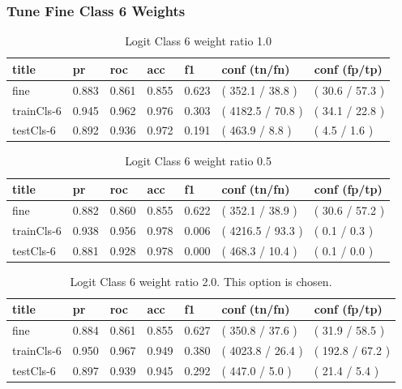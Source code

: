 \documentclass[ms]{nuthesis}
\begin{document}
\subsubsection{Tune Fine Class 6 Weights}

\FloatBarrier
\begin{table}[H]
\centering
\caption{Logit Class 6 weight ratio 1.0}
\label{tab:LogRegCls6-Wt1}
\begin{tabular}{|l||l||l||l||l||l||l|}\toprule
title & pr & roc & acc & f1 & conf (tn/fn) & conf (fp/tp) \\ \midrule
fine & 0.883 & 0.861 & 0.855 & 0.623 & ( 352.1 / 38.8 ) & ( 30.6 / 57.3 ) \\
trainCls-6 & 0.945 & 0.962 & 0.976 & 0.303 & ( 4182.5 / 70.8 ) & ( 34.1 / 22.8 ) \\
testCls-6 & 0.892 & 0.936 & 0.972 & 0.191 & ( 463.9 / 8.8 ) & ( 4.5 / 1.6 ) \\ \bottomrule
\end{tabular}
\end{table}
\FloatBarrier

\FloatBarrier
\begin{table}[H]
\centering
\caption{Logit Class 6 weight ratio 0.5}
\label{tab:LogRegCls6-Wtp5}
\begin{tabular}{|l||l||l||l||l||l||l|}\toprule
title & pr & roc & acc & f1 & conf (tn/fn) & conf (fp/tp) \\ \midrule
fine & 0.882 & 0.860 & 0.855 & 0.622 & ( 352.1 / 38.9 ) & ( 30.6 / 57.2 ) \\
trainCls-6 & 0.938 & 0.956 & 0.978 & 0.006 & ( 4216.5 / 93.3 ) & ( 0.1 / 0.3 ) \\
testCls-6 & 0.881 & 0.928 & 0.978 & 0.000 & ( 468.3 / 10.4 ) & ( 0.1 / 0.0 ) \\ \bottomrule
\end{tabular}
\end{table}
\FloatBarrier


\FloatBarrier
\begin{table}[H]
\centering
\caption{Logit Class 6 weight ratio 2.0. This option is chosen.}
\label{tab:LogRegCls6-Wt2}
\begin{tabular}{|l||l||l||l||l||l||l|}\toprule
title & pr & roc & acc & f1 & conf (tn/fn) & conf (fp/tp) \\ \midrule
fine & 0.884 & 0.861 & 0.855 & 0.627 & ( 350.8 / 37.6 ) & ( 31.9 / 58.5 ) \\
trainCls-6 & 0.950 & 0.967 & 0.949 & 0.380 & ( 4023.8 / 26.4 ) & ( 192.8 / 67.2 ) \\
testCls-6 & 0.897 & 0.939 & 0.945 & 0.292 & ( 447.0 / 5.0 ) & ( 21.4 / 5.4 ) \\ \bottomrule
\end{tabular}
\end{table}
\FloatBarrier
\end{document}
